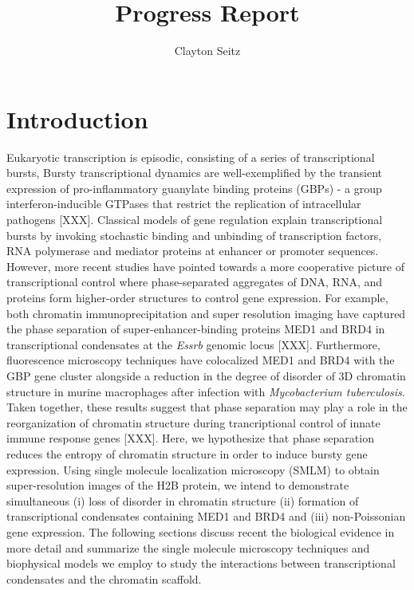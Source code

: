 \documentclass{article}
\begin{document}
\title{Progress Report}
\author{Clayton Seitz}
\maketitle
\thispagestyle{empty}


\section{Introduction}

Eukaryotic transcription is episodic, consisting of a series of transcriptional bursts, Bursty transcriptional dynamics are well-exemplified by the transient expression of pro-inflammatory guanylate binding proteins (GBPs) - a group interferon-inducible GTPases that restrict the replication of intracellular pathogens [XXX]. Classical models of gene regulation explain transcriptional bursts by invoking stochastic binding and unbinding of transcription factors, RNA polymerase and mediator proteins at enhancer or promoter sequences. However, more recent studies have pointed towards a more cooperative picture of transcriptional control where phase-separated aggregates of DNA, RNA, and proteins form higher-order structures to control gene expression. For example, both chromatin immunoprecipitation and super resolution imaging have captured the phase separation of super-enhancer-binding proteins MED1 and BRD4 in transcriptional condensates at the \textit{Essrb} genomic locus [XXX]. Furthermore, fluorescence microscopy techniques have colocalized MED1 and BRD4 with the GBP gene cluster alongside a reduction in the degree of disorder of 3D chromatin structure in murine macrophages after infection with \textit{Mycobacterium tuberculosis}. Taken together, these results suggest that phase separation may play a role in the reorganization of chromatin structure during trancriptional control of innate immune response genes [XXX]. Here, we hypothesize that phase separation reduces the entropy of chromatin structure in order to induce bursty gene expression. Using single molecule localization microscopy (SMLM) to obtain super-resolution images of the H2B protein, we intend to demonstrate simultaneous (i) loss of disorder in chromatin structure (ii) formation of transcriptional condensates containing MED1 and BRD4 and (iii) non-Poissonian gene expression. The following sections discuss recent the biological evidence in more detail and summarize the single molecule microscopy techniques and biophysical models we employ to study the interactions between transcriptional condensates and the chromatin scaffold.
\end{document}

